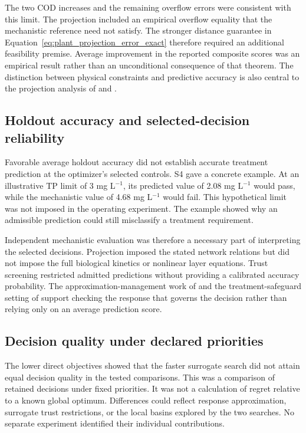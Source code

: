 The two COD increases and the remaining overflow errors were consistent with this limit. The projection included an empirical overflow equality that the mechanistic reference need not satisfy. The stronger distance guarantee in Equation~\eqref{eq:plant_projection_error_exact} therefore required an additional feasibility premise. Average improvement in the reported composite scores was an empirical result rather than an unconditional consequence of that theorem. The distinction between physical constraints and predictive accuracy is also central to the projection analysis of \citet{SturmSilva2024} and \citet{KircherVotsmeier2025}.

\subsection{Holdout accuracy and selected-decision reliability}

Favorable average holdout accuracy did not establish accurate treatment prediction at the optimizer's selected controls. S4 gave a concrete example. At an illustrative TP limit of 3 mg L$^{-1}$, its predicted value of 2.08 mg L$^{-1}$ would pass, while the mechanistic value of 4.68 mg L$^{-1}$ would fail. This hypothetical limit was not imposed in the operating experiment. The example showed why an admissible prediction could still misclassify a treatment requirement.

Independent mechanistic evaluation was therefore a necessary part of interpreting the selected decisions. Projection imposed the stated network relations but did not impose the full biological kinetics or nonlinear layer equations. Trust screening restricted admitted predictions without providing a calibrated accuracy probability. The approximation-management work of \citet{Hameed2026} and the treatment-safeguard setting of \citet{Ren2026} support checking the response that governs the decision rather than relying only on an average prediction score.

\subsection{Decision quality under declared priorities}

The lower direct objectives showed that the faster surrogate search did not attain equal decision quality in the tested comparisons. This was a comparison of retained decisions under fixed priorities. It was not a calculation of regret relative to a known global optimum. Differences could reflect response approximation, surrogate trust restrictions, or the local basins explored by the two searches. No separate experiment identified their individual contributions.

